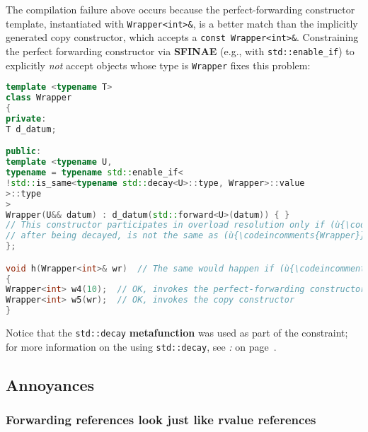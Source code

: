 \noindent The compilation failure above occurs because the perfect-forwarding
constructor template, instantiated with \texttt{Wrapper<int>\&}, is a
better match than the implicitly generated copy constructor, which
accepts a \texttt{const}~\texttt{Wrapper<int>\&}. Constraining the
perfect forwarding constructor via \textbf{SFINAE} (e.g., with
\texttt{std::enable\_if}) to explicitly \emph{not} accept objects whose
type is \texttt{Wrapper} fixes this problem:

\begin{lstlisting}[language=C++]
template <typename T>
class Wrapper
{
private:
T d_datum;

public:
template <typename U,
typename = typename std::enable_if<
!std::is_same<typename std::decay<U>::type, Wrapper>::value
>::type
>
Wrapper(U&& datum) : d_datum(std::forward<U>(datum)) { }
// This constructor participates in overload resolution only if (ù{\codeincomments{U}}ù),
// after being decayed, is not the same as (ù{\codeincomments{Wrapper}}ù).
};

void h(Wrapper<int>& wr)  // The same would happen if (ù{\codeincomments{wr}}ù) were passed by value.
{
Wrapper<int> w4(10);  // OK, invokes the perfect-forwarding constructor
Wrapper<int> w5(wr);  // OK, invokes the copy constructor
}
\end{lstlisting}

\noindent Notice that the \texttt{std::decay} \textbf{metafunction} was used as
part of the constraint; for more information on the using
\texttt{std::decay}, see \textit{: } on page~\pageref{metafunctions-are-required-in-constraints}.

\subsection[Annoyances]{Annoyances}\label{annoyances-forwardingref}

\subsubsection[Forwarding references look just like rvalue references]{Forwarding references look just like rvalue references}\label{forwarding-references-look-just-like-rvalue-references}

